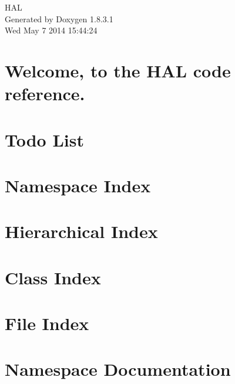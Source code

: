 \documentclass{book}
\begin{document}
\hypersetup{pageanchor=false,citecolor=blue}
\begin{titlepage}
\vspace*{7cm}
\begin{center}
{\Large H\-A\-L }\\
\vspace*{1cm}
{\large Generated by Doxygen 1.8.3.1}\\
\vspace*{0.5cm}
{\small Wed May 7 2014 15:44:24}\\
\end{center}
\end{titlepage}
\clearemptydoublepage
{}
\tableofcontents
\clearemptydoublepage
{}
\hypersetup{pageanchor=true,citecolor=blue}
\chapter{Welcome, to the H\-A\-L code reference.}
\label{index}\hypertarget{index}{}
\chapter{Todo List}
\label{todo}
\hypertarget{todo}{}

\chapter{Namespace Index}

\chapter{Hierarchical Index}

\chapter{Class Index}

\chapter{File Index}

\chapter{Namespace Documentation}

\end{document}
